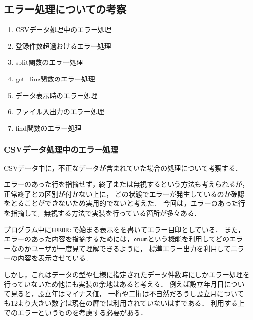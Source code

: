 \documentclass[a4j,11pt]{jarticle}
\begin{document}
\subsection{エラー処理についての考察}
\begin{enumerate}
\setlength{\parskip}{2pt} \setlength{\itemsep}{2pt}
    \item CSVデータ処理中のエラー処理
    \item 登録件数超過おけるエラー処理
    \item split関数のエラー処理
    \item get\_line関数のエラー処理
    \item データ表示時のエラー処理
    \item ファイル入出力のエラー処理
　　\item find関数のエラー処理
\end{enumerate}


\subsubsection{CSVデータ処理中のエラー処理}

CSVデータ中に，不正なデータが含まれていた場合の処理について考察する．

エラーのあった行を指摘せず，終了または無視するという方法も考えられるが，正常終了との区別が付かない上に，
どの状態でエラーが発生しているのか確認をとることができないため実用的でないと考えた．
今回は，エラーのあった行を指摘して，無視する方法で実装を行っている箇所が多々ある．

プログラム中に\verb|ERROR:|で始まる表示をを書いてエラー目印としている．
また，エラーのあった内容を指摘するためには，\verb|enum|という機能を利用してどのエラーなのかユーザが一度見て理解できるように，
標準エラー出力を利用してエラーの内容を表示させている．

しかし，これはデータの型や仕様に指定されたデータ件数時にしかエラー処理を行っていないため他にも実装の余地はあると考える．
例えば設立年月日について見ると，設立年はマイナス値，
一桁や二桁は不自然だろうし設立月についても$12$より大きい数字は現在の暦では利用されていないはずである．
利用する上でのエラーというものを考慮する必要がある．

\end{document}

